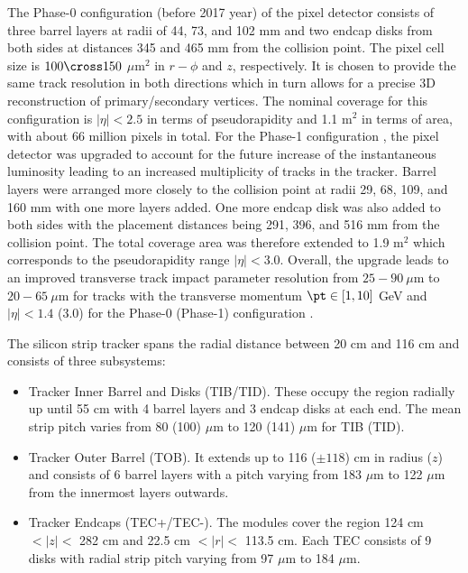 The Phase-0 configuration (before 2017 year) of the pixel detector consists of three barrel layers at radii of 44, 73, and 102 mm and two endcap disks from both sides at distances 345 and 465 mm from the collision point. The pixel cell size is $100\cross 150$ $\mu\text{m}^2$ in $r-\phi$ and $z$, respectively. It is chosen to provide the same track resolution in both directions which in turn allows for a precise 3D reconstruction of primary/secondary vertices. The nominal coverage for this configuration is $|\eta| < 2.5$ in terms of pseudorapidity and 1.1 $\text{m}^2$ in terms of area, with about 66 million pixels in total. For the Phase-1 configuration \cite{CMSTrackerGroup:2020edz}, the pixel detector was upgraded to account for the future increase of the instantaneous luminosity leading to an increased multiplicity of tracks in the tracker. Barrel layers were arranged more closely to the collision point at radii 29, 68, 109, and 160 mm with one more layers added. One more endcap disk was also added to both sides with the placement distances being 291, 396, and 516 mm from the collision point. The total coverage area was therefore extended to 1.9 $\text{m}^2$ which corresponds to the pseudorapidity range $|\eta| < 3.0$. Overall, the upgrade leads to an improved transverse track impact parameter resolution from $25-90 ~\mu\text{m}$ to $20-65 ~\mu\text{m}$ for tracks with the transverse momentum $\pt \in [1,10]$ GeV and $|\eta|<1.4$ (3.0) for the Phase-0 (Phase-1) configuration \cite{CMS-DP-2020-049}.

The silicon strip tracker spans the radial distance between 20 cm and 116 cm and consists of three subsystems:
\begin{itemize}
    \item Tracker Inner Barrel and Disks (TIB/TID). These occupy the region radially up until 55 cm with 4 barrel layers and 3 endcap disks at each end. The mean strip pitch varies from 80 (100) $\mu\text{m}$ to  120 (141) $\mu\text{m}$ for TIB (TID).
    \item Tracker Outer Barrel (TOB). It extends up to 116 ($\pm118$) cm in radius ($z$) and consists of 6 barrel layers with a pitch varying from 183 $\mu\text{m}$ to 122 $\mu\text{m}$ from the innermost layers outwards.
    \item Tracker Endcaps (TEC+/TEC-). The modules cover the region 124 cm $< |z| <$ 282 cm and 22.5 cm $< |r| <$ 113.5 cm. Each TEC consists of 9 disks with radial strip pitch varying from 97 $\mu\text{m}$ to 184 $\mu\text{m}$. 
\end{itemize}

